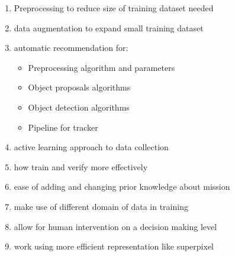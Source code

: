 \begin{enumerate}
    \item Preprocessing to reduce size of training dataset needed
    \item data augmentation to expand small training dataset
    \item automatic recommendation for:
        \begin{itemize}
            \item Preprocessing algorithm and parameters
            \item Object proposals algorithms
            \item Object detection algorithms
            \item Pipeline for tracker
        \end{itemize}
    \item active learning approach to data collection
    \item how train and verify more effectively
    \item ease of adding and changing prior knowledge about mission
    \item make use of different domain of data in training 
    \item allow for human intervention on a decision making level
    \item work using more efficient representation like superpixel
\end{enumerate}

